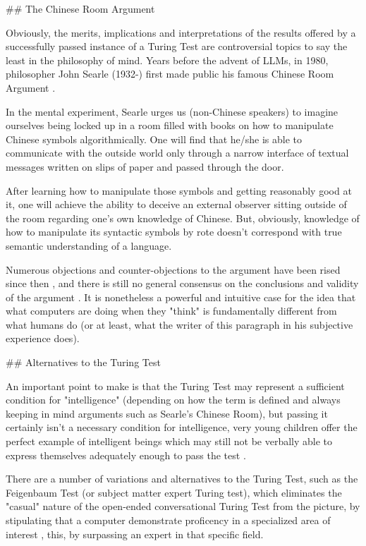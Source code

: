 ## The Chinese Room Argument

Obviously, the merits, implications and interpretations of the results offered by a successfully passed instance of a Turing Test are controversial topics to say the least in the philosophy of mind. Years before the advent of LLMs, in 1980, philosopher John Searle (1932-) first made public his famous Chinese Room Argument \cite{searle1999chinese}.

In the mental experiment, Searle urges us (non-Chinese speakers) to imagine ourselves being locked up in a room filled with books on how to manipulate Chinese symbols algorithmically. One will find that he/she is able to communicate with the outside world only through a narrow interface of textual messages written on slips of paper and passed through the door.

After learning how to manipulate those symbols and getting reasonably good at it, one will achieve the ability to deceive an external observer sitting outside of the room regarding one's own knowledge of Chinese. But, obviously, knowledge of how to manipulate its syntactic symbols by rote doesn't correspond with true semantic understanding of a language.

Numerous objections and counter-objections to the argument have been rised since then \cite{chineseroomstan}, and there is still no general consensus on the conclusions and validity of the argument \cite{chineseroomstan}. It is nonetheless a powerful and intuitive case for the idea that what computers are doing when they "think" is fundamentally different from what humans do (or at least, what the writer of this paragraph in his subjective experience does).

## Alternatives to the Turing Test

An important point to make is that the Turing Test may represent a sufficient condition for "intelligence" (depending on how the term is defined and always keeping in mind arguments such as Searle's Chinese Room), but passing it certainly isn't a necessary condition for intelligence, very young children offer the perfect example of intelligent beings which may still not be verbally able to express themselves adequately enough to pass the test \cite{smith2006history}.

There are a number of variations and alternatives to the Turing Test, such as the Feigenbaum Test (or subject matter expert Turing test), which eliminates the "casual" nature of the open-ended conversational Turing Test from the picture, by stipulating that a computer demonstrate proficency in a specialized area of interest \cite{smith2006history}, this, by surpassing an expert in that specific field.

